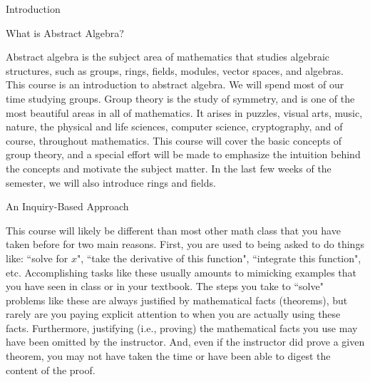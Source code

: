 \begin{chapter}{Introduction}

\begin{section}{What is Abstract Algebra?}

Abstract algebra is the subject area of mathematics that studies algebraic structures, such as groups, rings, fields, modules, vector spaces, and algebras. This course is an introduction to abstract algebra. We will spend most of our time studying groups. Group theory is the study of symmetry, and is one of the most beautiful areas in all of mathematics. It arises in puzzles, visual arts, music, nature, the physical and life sciences, computer science, cryptography, and of course, throughout mathematics. This course will cover the basic concepts of group theory, and a special effort will be made to emphasize the intuition behind the concepts and motivate the subject matter.  In the last few weeks of the semester, we will also introduce rings and fields.

\end{section}

\begin{section}{An Inquiry-Based Approach}

This course will likely be different than most other math class that you have taken before for two main reasons. First, you are used to being asked to do things like: ``solve for $x$", ``take the derivative of this function", ``integrate this function", etc. Accomplishing tasks like these usually amounts to mimicking examples that you have seen in class or in your textbook. The steps you take to ``solve" problems like these are always justified by mathematical facts (theorems), but rarely are you paying explicit attention to when you are actually using these facts. Furthermore, justifying (i.e., proving) the mathematical facts you use may have been omitted by the instructor. And, even if the instructor did prove a given theorem, you may not have taken the time or have been able to digest the content of the proof.


\end{section}
\end{chapter}
